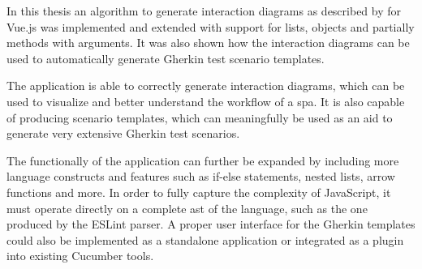 In this thesis an algorithm to generate interaction diagrams as described by \textcite{zhang2019scenario} for Vue.js was implemented and extended with support for lists, objects and partially methods with arguments. It was also shown how the interaction diagrams can be used to automatically generate Gherkin test scenario templates.

The application is able to correctly generate interaction diagrams, which can be used to visualize and better understand the workflow of a \gls{spa}.
It is also capable of producing scenario templates, which can meaningfully be used as an aid to generate very extensive Gherkin test scenarios. 

The functionally of the application can further be expanded by including more language constructs and features such as if-else statements, nested lists, arrow functions and more. In order to fully capture the complexity of JavaScript, it must operate directly on a complete \gls{ast} of the language, such as the one produced by the ESLint parser.
A proper user interface for the Gherkin templates could also be implemented as a standalone application or integrated as a plugin into existing Cucumber tools.